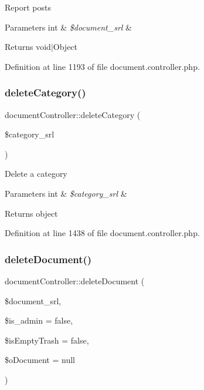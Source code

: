 Report posts 
\begin{DoxyParams}[1]{Parameters}
int & {\em \$document\+\_\+srl} & \\
\hline
\end{DoxyParams}
\begin{DoxyReturn}{Returns}
void$\vert$\+Object 
\end{DoxyReturn}


Definition at line 1193 of file document.\+controller.\+php.

\mbox{\label{classdocumentController_ad5840bc0f6ed0040779c5d90d8c327a6}} 
\subsubsection{\texorpdfstring{delete\+Category()}{deleteCategory()}}
{\footnotesize\ttfamily document\+Controller\+::delete\+Category (\begin{DoxyParamCaption}\item[{}]{\$category\+\_\+srl }\end{DoxyParamCaption})}

Delete a category 
\begin{DoxyParams}[1]{Parameters}
int & {\em \$category\+\_\+srl} & \\
\hline
\end{DoxyParams}
\begin{DoxyReturn}{Returns}
object 
\end{DoxyReturn}


Definition at line 1438 of file document.\+controller.\+php.

\mbox{\label{classdocumentController_a93df4318474646597031e6a1ea50c884}} 
\subsubsection{\texorpdfstring{delete\+Document()}{deleteDocument()}}
{\footnotesize\ttfamily document\+Controller\+::delete\+Document (\begin{DoxyParamCaption}\item[{}]{\$document\+\_\+srl,  }\item[{}]{\$is\+\_\+admin = {\ttfamily false},  }\item[{}]{\$is\+Empty\+Trash = {\ttfamily false},  }\item[{}]{\$o\+Document = {\ttfamily null} }\end{DoxyParamCaption})}

